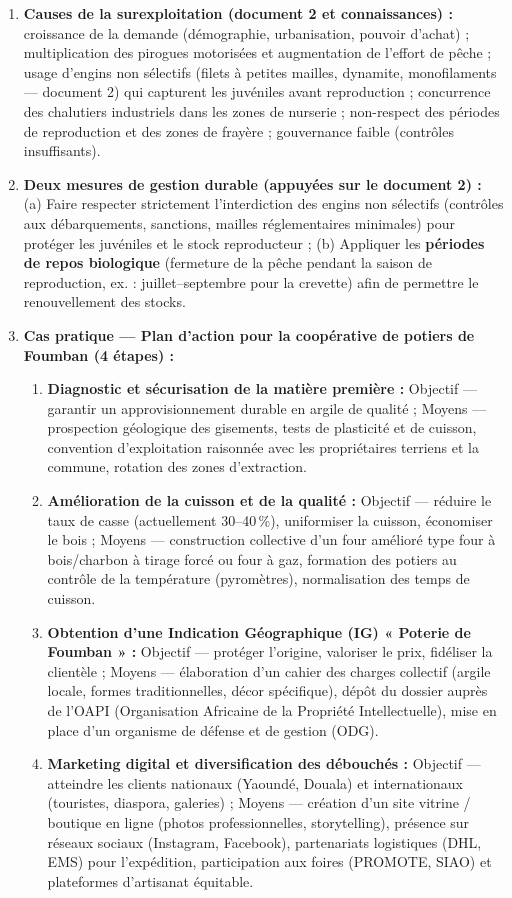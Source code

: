 \documentclass[11pt]{article}
\begin{document}
\begin{corrige}
\begin{enumerate}
\item \textbf{Causes de la surexploitation (document 2 et connaissances) :} croissance de la demande (démographie, urbanisation, pouvoir d'achat) ; multiplication des pirogues motorisées et augmentation de l'effort de pêche ; usage d'engins non sélectifs (filets à petites mailles, dynamite, monofilaments — document 2) qui capturent les juvéniles avant reproduction ; concurrence des chalutiers industriels dans les zones de nurserie ; non-respect des périodes de reproduction et des zones de frayère ; gouvernance faible (contrôles insuffisants).
\item \textbf{Deux mesures de gestion durable (appuyées sur le document 2) :} (a) Faire respecter strictement l'interdiction des engins non sélectifs (contrôles aux débarquements, sanctions, mailles réglementaires minimales) pour protéger les juvéniles et le stock reproducteur ; (b) Appliquer les \textbf{périodes de repos biologique} (fermeture de la pêche pendant la saison de reproduction, ex. : juillet–septembre pour la crevette) afin de permettre le renouvellement des stocks.
\item \textbf{Cas pratique — Plan d'action pour la coopérative de potiers de Foumban (4 étapes) :}
\begin{enumerate}
\item \textbf{Diagnostic et sécurisation de la matière première :} Objectif — garantir un approvisionnement durable en argile de qualité ; Moyens — prospection géologique des gisements, tests de plasticité et de cuisson, convention d'exploitation raisonnée avec les propriétaires terriens et la commune, rotation des zones d'extraction.
\item \textbf{Amélioration de la cuisson et de la qualité :} Objectif — réduire le taux de casse (actuellement 30–40\,\%), uniformiser la cuisson, économiser le bois ; Moyens — construction collective d'un four amélioré type four à bois/charbon à tirage forcé ou four à gaz, formation des potiers au contrôle de la température (pyromètres), normalisation des temps de cuisson.
\item \textbf{Obtention d'une Indication Géographique (IG) « Poterie de Foumban » :} Objectif — protéger l'origine, valoriser le prix, fidéliser la clientèle ; Moyens — élaboration d'un cahier des charges collectif (argile locale, formes traditionnelles, décor spécifique), dépôt du dossier auprès de l'OAPI (Organisation Africaine de la Propriété Intellectuelle), mise en place d'un organisme de défense et de gestion (ODG).
\item \textbf{Marketing digital et diversification des débouchés :} Objectif — atteindre les clients nationaux (Yaoundé, Douala) et internationaux (touristes, diaspora, galeries) ; Moyens — création d'un site vitrine / boutique en ligne (photos professionnelles, storytelling), présence sur réseaux sociaux (Instagram, Facebook), partenariats logistiques (DHL, EMS) pour l'expédition, participation aux foires (PROMOTE, SIAO) et plateformes d'artisanat équitable.

\end{enumerate}
\end{enumerate}
\end{corrige}
\end{document}
